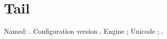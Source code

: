 \section{Tail}
Named: . Configuration version \gm@cfgversion.
Engine \gm@engine; Unicode \gm@unicode; \gm@logo.
